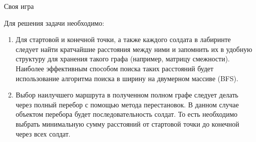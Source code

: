 \begin{tutorial}{Своя игра}

Для решения задачи необходимо:
\begin{enumerate}
\item Для стартовой и конечной точки, а также каждого солдата в лабиринте следует найти кратчайшие расстояния между ними и запомнить их в удобную структуру для хранения такого графа (например, матрицу смежности). Наиболее эффективным способом поиска таких расстояний будет использование алгоритма поиска в ширину на двумерном массиве (BFS).
\item Выбор наилучшего маршрута в полученном полном графе следует делать через полный перебор с помощью метода перестановок. В данном случае объектом перебора будет последовательность солдат. То есть необходимо выбрать минимальную сумму расстояний от стартовой точки до конечной через всех солдат.
\end{enumerate}

\end{tutorial}
